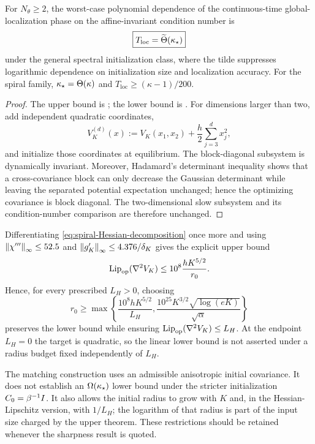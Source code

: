 \begin{corollary}
\label{cor:cont-sharp}
For $N_\theta\geq2$, the worst-case polynomial dependence of the continuous-time
global-localization phase on the affine-invariant condition number is
\begin{equation}
\label{eq:cont-sharp-rate}
    \boxed{T_{\mathrm{loc}}=\widetilde\Theta(\kappa_\star)}
\end{equation}
under the general spectral initialization class, where the tilde suppresses logarithmic dependence
on initialization size and localization accuracy.  For the spiral family,
$\kappa_\star=\Theta(\kappa)$ and
$T_{\mathrm{loc}}\geq(\kappa-1)/200$.
\end{corollary}

\begin{proof}
The upper bound is ; the lower bound is
.  For dimensions larger than two, add independent quadratic coordinates,
\[
    V_K^{(d)}(x)
    :=V_K(x_1,x_2)+\frac h2\sum_{j=3}^d x_j^2,
\]
and initialize those coordinates at equilibrium.  The block-diagonal subsystem is dynamically
invariant.  Moreover, Hadamard's determinant inequality shows that a cross-covariance block can
only decrease the Gaussian determinant while leaving the separated potential expectation
unchanged; hence the optimizing covariance is block diagonal.  The two-dimensional slow subsystem
and its condition-number comparison are therefore unchanged.
\end{proof}

\begin{remark}
Differentiating \eqref{eq:spiral-Hessian-decomposition} once more and using
$\left\lVert \chi'''\right\rVert_\infty\leq52.5$ and
$\left\lVert g_K'\right\rVert_\infty\leq4.376/\delta_K$ gives the explicit upper bound
\[
    \operatorname{Lip}_{\mathrm{op}}(\nabla^2V_K)
    \leq
    10^8\frac{hK^{5/2}}{r_0}.
\]
Hence, for every prescribed $L_H>0$, choosing
\[
    r_0\geq
    \max\left\{
        \frac{10^8hK^{5/2}}{L_H},
        \frac{10^{25}K^{3/2}\sqrt{\log(eK)}}{\sqrt\alpha}
    \right\}
\]
preserves the lower bound while ensuring
$\operatorname{Lip}_{\mathrm{op}}(\nabla^2V_K)\leq L_H$.  At the endpoint $L_H=0$ the target is
quadratic, so the linear lower bound is not asserted under a radius budget fixed independently of
$L_H$.
\end{remark}

\begin{remark}
The matching construction uses an admissible anisotropic initial covariance.  It does not establish
an $\Omega(\kappa_\star)$ lower bound under the stricter initialization
$C_0=\beta^{-1}I$.  It also allows the initial radius to grow with $K$ and, in the
Hessian-Lipschitz version, with $1/L_H$; the logarithm of that radius is part of the input size
charged by the upper theorem.  These restrictions should be retained whenever the sharpness result
is quoted.
\end{remark}


